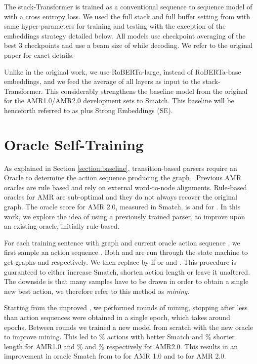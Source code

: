 \documentclass[11pt,a4paper]{article}
\begin{document}
The stack-Transformer is trained as a conventional sequence to sequence model of  with a cross entropy loss. We used the full stack and full buffer setting from \cite{anon2020a} with same hyper-parameters for training and testing with the exception of the embeddings strategy detailed below. All models use checkpoint averaging \cite{junczys-dowmunt-etal-2016-amu} of the best 3 checkpoints and use a beam size of \footnotemark{} while decoding. We refer to the original paper for exact details. 

Unlike in the original work, we use RoBERTa-large, instead of RoBERTa-base embeddings, and we feed the average of all layers as input to the stack-Transformer. This considerably strengthens the baseline model from the original  for the AMR1.0/AMR2.0 development sets to  Smatch\footnotemark{}. This baseline will be henceforth referred to as \cite{anon2020a} plus Strong Embeddings (SE). 
 
\section{Oracle Self-Training}
\label{section:oracle}
As explained in Section \ref{section:baseline}, transition-based parsers require an Oracle  to determine the action sequence producing the graph . Previous AMR oracles \cite{ballesteros-al-onaizan-2017-amr,naseem-etal-2019-rewarding,anon2020a} are rule based and rely on external word-to-node alignments. Rule-based oracles for AMR are sub-optimal and they do not always recover the original graph. The oracle score for AMR 2.0, measured in Smatch, is  \cite{anon2020a} and  for \cite{naseem-etal-2019-rewarding}. In this work, we explore the idea of using a previously trained parser,  to improve upon an existing oracle, initially rule-based. 

For each training sentence  with graph  and current oracle action sequence , we first sample an action sequence . Both  and  are run through the state machine  to get graphs  and  respectively. We then replace  by  if  or 
 and . This procedure is guaranteed to either increase Smatch, shorten action length or leave it unaltered. The downside is that many samples have to be drawn in order to obtain a single new best action, we therefore refer to this method as \textit{mining}. 

Starting from the improved \cite{anon2020a}, we performed  rounds of mining, stopping after less than  action sequences were obtained in a single epoch, which takes around  epochs\footnotemark{}. Between rounds we trained a new model from scratch with the new oracle to improve mining. This led to \% actions with better Smatch and \% shorter length for AMR1.0 and \% and \% respectively for AMR2.0. This results in an improvement in oracle Smatch from  to  for AMR 1.0 and  to  for AMR 2.0.
\end{document}
